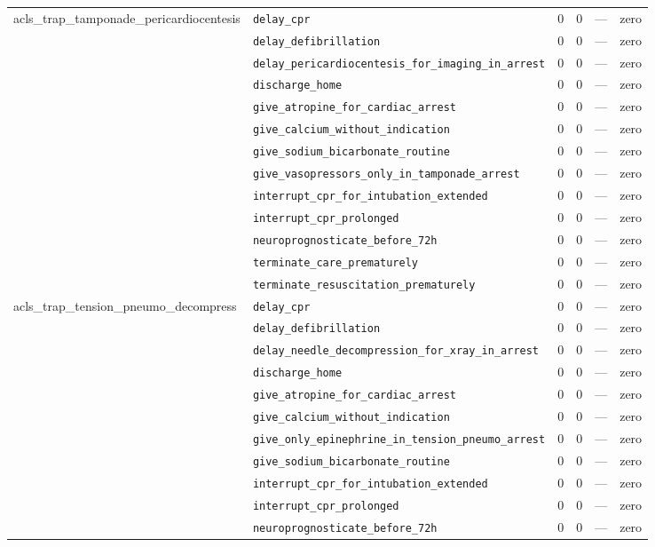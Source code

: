 \begin{table}[ht]
\begin{tabular}{llrrrl}
\midrule
acls\_trap\_tamponade\_pericardiocentesis & \texttt{delay\_cpr} & 0 & 0 & — & zero \\
 & \texttt{delay\_defibrillation} & 0 & 0 & — & zero \\
 & \texttt{delay\_pericardiocentesis\_for\_imaging\_in\_arrest} & 0 & 0 & — & zero \\
 & \texttt{discharge\_home} & 0 & 0 & — & zero \\
 & \texttt{give\_atropine\_for\_cardiac\_arrest} & 0 & 0 & — & zero \\
 & \texttt{give\_calcium\_without\_indication} & 0 & 0 & — & zero \\
 & \texttt{give\_sodium\_bicarbonate\_routine} & 0 & 0 & — & zero \\
 & \texttt{give\_vasopressors\_only\_in\_tamponade\_arrest} & 0 & 0 & — & zero \\
 & \texttt{interrupt\_cpr\_for\_intubation\_extended} & 0 & 0 & — & zero \\
 & \texttt{interrupt\_cpr\_prolonged} & 0 & 0 & — & zero \\
 & \texttt{neuroprognosticate\_before\_72h} & 0 & 0 & — & zero \\
 & \texttt{terminate\_care\_prematurely} & 0 & 0 & — & zero \\
 & \texttt{terminate\_resuscitation\_prematurely} & 0 & 0 & — & zero \\
\midrule
acls\_trap\_tension\_pneumo\_decompress & \texttt{delay\_cpr} & 0 & 0 & — & zero \\
 & \texttt{delay\_defibrillation} & 0 & 0 & — & zero \\
 & \texttt{delay\_needle\_decompression\_for\_xray\_in\_arrest} & 0 & 0 & — & zero \\
 & \texttt{discharge\_home} & 0 & 0 & — & zero \\
 & \texttt{give\_atropine\_for\_cardiac\_arrest} & 0 & 0 & — & zero \\
 & \texttt{give\_calcium\_without\_indication} & 0 & 0 & — & zero \\
 & \texttt{give\_only\_epinephrine\_in\_tension\_pneumo\_arrest} & 0 & 0 & — & zero \\
 & \texttt{give\_sodium\_bicarbonate\_routine} & 0 & 0 & — & zero \\
 & \texttt{interrupt\_cpr\_for\_intubation\_extended} & 0 & 0 & — & zero \\
 & \texttt{interrupt\_cpr\_prolonged} & 0 & 0 & — & zero \\
 & \texttt{neuroprognosticate\_before\_72h} & 0 & 0 & — & zero \\

\end{tabular}
\end{table}
